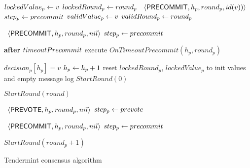 \begin{algorithm}[htb!]
\begin{algorithmic}[1]
\SPACE
{} \label{line:tab:recvPrevote}
	\STATE $lockedValue_p \leftarrow v$                \label{line:tab:setLockedValue}
	\STATE $lockedRound_p \leftarrow round_p$   \label{line:tab:setLockedRound} 
	\STATE \Broadcast \ $\langle\mathsf{PRECOMMIT},h_p,round_p,id(v))\rangle$  \label{line:tab:precommit-v}	
	\STATE $step_p \leftarrow precommit$ \label{line:tab:setStateToCommit}
	\ENDIF
	\STATE $validValue_p \leftarrow v$                          \label{line:tab:setValidRound}
	\STATE $validRound_p \leftarrow round_p$             \label{line:tab:setValidValue}
\ENDUPON

\SHORTSPACE
{}
	\STATE \Broadcast \ $\langle\mathsf{PRECOMMIT},h_p,round_p, nil\rangle$   \label{line:tab:precommit-v-1}
	\STATE $step_p \leftarrow precommit$
\ENDUPON

\SPACE
{} \label{line:tab:startTimeoutPrecommit}
	\STATE \textbf{after} $timeoutPrecommit$ execute $OnTimeoutPrecommit(h_p, round_p)$
\ENDUPON 

\SPACE
{} \label{line:tab:onDecideRule} 
 \label{line:tab:validDecisionValue}
	\STATE $decision_p[h_p] = v$   \label{line:tab:decide} 
	\STATE$h_p \leftarrow h_p + 1$  \label{line:tab:increaseHeight} 
	\STATE reset $lockedRound_p$, $lockedValue_p$ to init values and empty message log 
	\STATE $StartRound(0)$   	
\ENDIF
\ENDUPON

\SHORTSPACE
{} \label{line:tab:skipRounds}
\STATE $StartRound(round)$ \label{line:tab:nextRound2}
\ENDUPON

\SHORTSPACE
{} \label{line:tab:onTimeoutPropose}
\STATE \Broadcast \ $\langle\mathsf{PREVOTE},h_p,round_p, nil\rangle$  \label{line:tab:prevote-nil-on-timeout}	
\STATE $step_p \leftarrow prevote$
\ENDIF	
\ENDFUNCTION

\SHORTSPACE
{} \label{line:tab:onTimeoutPrevote}
\STATE \Broadcast \ $\langle\mathsf{PRECOMMIT},h_p,round_p,nil\rangle$   \label{line:tab:precommit-nil-onTimeout}
\STATE $step_p \leftarrow precommit$
\ENDIF	
\ENDFUNCTION

\SHORTSPACE
{} \label{line:tab:onTimeoutPrecommit}
\STATE $StartRound(round_p + 1)$ \label{line:tab:nextRound} 
\ENDIF	
\ENDFUNCTION	
\end{algorithmic}
\caption{Tendermint consensus algorithm}
\label{alg:tendermint}
\end{algorithm}

